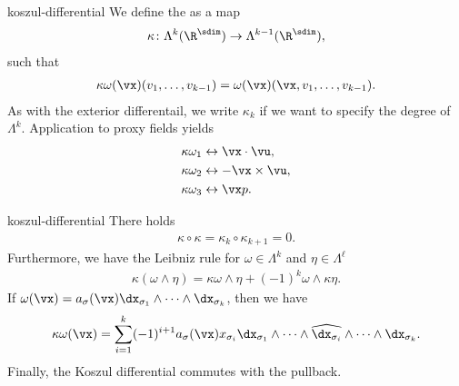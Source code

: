\begin{Definition}{koszul-differential}
  We define the  as a map
  \begin{gather}
    \kappa\colon \Lambda^k(\R^\sdim) \to \Lambda^{k-1}(\R^\sdim),
  \end{gather}
  such that
  \begin{gather}
    \kappa\omega(\vx) (v_1,\dots,v_{k-1})
    = \omega(\vx) (\vx,v_1,\dots,v_{k-1}).
  \end{gather}
  As with the exterior differentail, we write $\kappa_k$ if we want to
  specify the degree of $\Lambda^k$.  Application to proxy fields yields
  \begin{gather}
    \label{eq:derham:13}
    \begin{aligned}
      \kappa\omega_1 &\leftrightarrow \vx\cdot\vu,\\
      \kappa\omega_2 &\leftrightarrow -\vx\times\vu,\\
      \kappa\omega_3 &\leftrightarrow \vx p.
    \end{aligned}
  \end{gather}
\end{Definition}

\begin{Lemma}{koszul-differential}
  There holds
  \begin{gather}
    \label{eq:derham:14}
    \kappa\circ\kappa = \kappa_k\circ\kappa_{k+1} = 0.
  \end{gather}
  Furthermore, we have the Leibniz rule for $\omega\in \Lambda^k$ and
  $\eta\in\Lambda^\ell$
  \begin{gather}
    \kappa(\omega\wedge\eta) = \kappa\omega\wedge\eta
    + (-1)^k \omega\wedge\kappa\eta.
  \end{gather}
  If
  $\omega(\vx) = a_\sigma(\vx)
  \dx_{\sigma_1}\wedge\dots\wedge\dx_{\sigma_k}$, then we have
  \begin{gather}
    \kappa\omega(\vx) = \sum_{i=1}^k (-1)^{i+1} a_\sigma(\vx)x_{\sigma_i}
    \dx_{\sigma_1}\wedge\dots\wedge\widehat{\dx_{\sigma_i}}
    \wedge\dots\wedge\dx_{\sigma_k}.
  \end{gather}
  Finally, the Koszul differential commutes with the pullback.
\end{Lemma}

